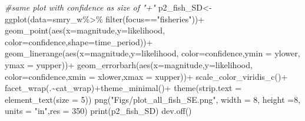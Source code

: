 \documentclass[
]{article}
\newenvironment{Shaded}{\begin{snugshade}}{\end{snugshade}}
\newcommand{\AttributeTok}[1]{\textcolor[rgb]{0.77,0.63,0.00}{#1}}
\newcommand{\CommentTok}[1]{\textcolor[rgb]{0.56,0.35,0.01}{\textit{#1}}}
\newcommand{\DecValTok}[1]{\textcolor[rgb]{0.00,0.00,0.81}{#1}}
\newcommand{\FunctionTok}[1]{\textcolor[rgb]{0.00,0.00,0.00}{#1}}
\newcommand{\NormalTok}[1]{#1}
\newcommand{\OtherTok}[1]{\textcolor[rgb]{0.56,0.35,0.01}{#1}}
\newcommand{\SpecialCharTok}[1]{\textcolor[rgb]{0.00,0.00,0.00}{#1}}
\newcommand{\StringTok}[1]{\textcolor[rgb]{0.31,0.60,0.02}{#1}}
\begin{document}
\begin{Shaded}
\begin{Highlighting}[]
   
     \CommentTok{\#same plot with confidence as size of "+"}
\NormalTok{     p2\_fish\_SD}\OtherTok{\textless{}{-}} \FunctionTok{ggplot}\NormalTok{(}\AttributeTok{data=}\NormalTok{smry\_w}\SpecialCharTok{\%\textgreater{}\%}
                           \FunctionTok{filter}\NormalTok{(focus}\SpecialCharTok{==}\StringTok{"fisheries"}\NormalTok{))}\SpecialCharTok{+}
       \FunctionTok{geom\_point}\NormalTok{(}\FunctionTok{aes}\NormalTok{(}\AttributeTok{x=}\NormalTok{magnitude,}\AttributeTok{y=}\NormalTok{likelihood,}
                      \AttributeTok{color=}\NormalTok{confidence,}\AttributeTok{shape=}\NormalTok{time\_period))}\SpecialCharTok{+}
        \FunctionTok{geom\_linerange}\NormalTok{(}\FunctionTok{aes}\NormalTok{(}\AttributeTok{x=}\NormalTok{magnitude,}\AttributeTok{y=}\NormalTok{likelihood,}
                           \AttributeTok{color=}\NormalTok{confidence,}\AttributeTok{ymin =}\NormalTok{ ylower, }\AttributeTok{ymax =}\NormalTok{ yupper))}\SpecialCharTok{+}
       \FunctionTok{geom\_errorbarh}\NormalTok{(}\FunctionTok{aes}\NormalTok{(}\AttributeTok{x=}\NormalTok{magnitude,}\AttributeTok{y=}\NormalTok{likelihood,}
                          \AttributeTok{color=}\NormalTok{confidence,}\AttributeTok{xmin =}\NormalTok{ xlower,}\AttributeTok{xmax =}\NormalTok{ xupper))}\SpecialCharTok{+}
      \FunctionTok{scale\_color\_viridis\_c}\NormalTok{()}\SpecialCharTok{+}
      \FunctionTok{facet\_wrap}\NormalTok{(.}\SpecialCharTok{\textasciitilde{}}\NormalTok{cat\_wrap)}\SpecialCharTok{+}\FunctionTok{theme\_minimal}\NormalTok{()}\SpecialCharTok{+} 
       \FunctionTok{theme}\NormalTok{(}\AttributeTok{strip.text =} \FunctionTok{element\_text}\NormalTok{(}\AttributeTok{size =} \DecValTok{5}\NormalTok{))}
    \FunctionTok{png}\NormalTok{(}\StringTok{"Figs/plot\_all\_fish\_SE.png"}\NormalTok{, }
        \AttributeTok{width =} \DecValTok{8}\NormalTok{, }\AttributeTok{height =}\DecValTok{8}\NormalTok{, }\AttributeTok{units =} \StringTok{"in"}\NormalTok{,}\AttributeTok{res =} \DecValTok{350}\NormalTok{)}
    \FunctionTok{print}\NormalTok{(p2\_fish\_SD)}
    \FunctionTok{dev.off}\NormalTok{()}
    

\end{Highlighting}
\end{Shaded}
\end{document}
